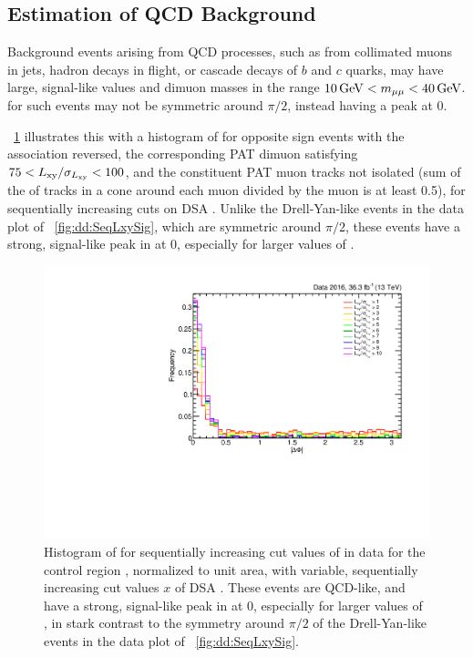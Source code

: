 \subsection{Estimation of QCD Background}
\label{sec:dd:bgest-QCD}
Background events arising from QCD processes, such as from collimated muons in jets, hadron decays in flight, or cascade decays of $b$ and $c$ quarks, may have large, signal-like \LxySig values and dimuon masses in the range $10\,\text{Ge\hspace{-.08em}V} < m_{\mathrm{\mu}\mathrm{\mu}} < 40\,\text{Ge\hspace{-.08em}V}$.
\DeltaPhi for such events may not be symmetric around $\pi/2$, instead having a peak at 0.

\Fig~\ref{fig:dd:SeqLxySig_QCD_DeltaPhi} illustrates this with a histogram of \DeltaPhi for opposite sign events with the \DSAToPAT association reversed, the corresponding PAT dimuon satisfying $75 < L_{\mathrm{xy}}/\sigma_{L_{\mathrm{xy}}} < 100$, and the constituent PAT muon tracks not isolated (sum of the \pT of tracks in a \deltaR cone around each muon divided by the muon \pT is at least 0.5), for sequentially increasing cuts on DSA \LxySig.
Unlike the \mbox{Drell-Yan}-like events in the data plot of \Fig~\ref{fig:dd:SeqLxySig}, which are symmetric around $\pi/2$, these events have a strong, signal-like peak in \DeltaPhi at 0, especially for larger values of \LxySig.

\begin{figure}[htpb]
  \centering
  \includegraphics[width=\DFigWidth]{figures/displaced/BGEST_EffectOfLxySigCut_DeltaPhi_Data_QCD-Like.pdf}
  \caption[Histogram of \DeltaPhi for sequentially increasing cut values of \LxySig for QCD-like events in data.]{Histogram of \DeltaPhi for sequentially increasing cut values of \LxySig in data for the control region , normalized to unit area, with variable, sequentially increasing cut values $x$ of DSA \LxySig. These events are QCD-like, and have a strong, signal-like peak in \DeltaPhi at 0, especially for larger values of \LxySig, in stark contrast to the symmetry around $\pi/2$ of the \mbox{Drell-Yan}-like events in the data plot of \Fig~\ref{fig:dd:SeqLxySig}.}
  \label{fig:dd:SeqLxySig_QCD_DeltaPhi}
\end{figure}


